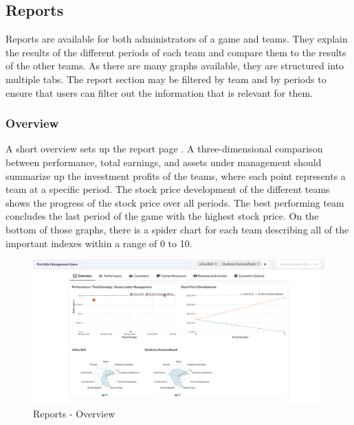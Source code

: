 \subsection{Reports}
\label{subsec:reports}
Reports are available for both administrators of a game and teams. They explain the results of the different periods of each team and compare them to the results of the other teams. As there are many graphs available, they are structured into multiple tabs. The report section may be filtered by team and by periods to ensure that users can filter out the information that is relevant for them.

\subsubsection{Overview}
A short overview sets up the report page . A three-dimensional comparison between performance, total earnings, and assets under management should summarize up the investment profits of the teams, where each point represents a team at a specific period. The stock price development of the different teams shows the progress of the stock price over all periods. The best performing team concludes the last period of the game with the highest stock price. On the bottom of those graphs, there is a spider chart for each team describing all of the important indexes within a range of 0 to 10.
\begin{figure}[h!]
  \centering
  \includegraphics[scale=0.2]{img/application-overview/reports/01_overview.png}
  \caption{Reports - Overview}
  \label{fig:reports_overview}
\end{figure}

